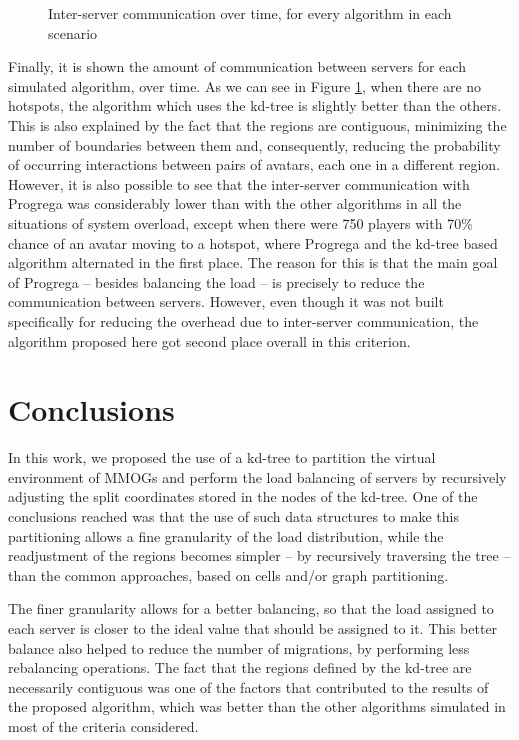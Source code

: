 \documentclass[acmjacm]{acmtrans2m}
\newcommand{\figurecaption}{Figure}
\begin{document}
\begin{figure}[!t]
	\caption{Inter-server communication over time, for every algorithm in each scenario}
	\label{fig:overhead}
\end{figure}

Finally, it is shown the amount of communication between servers for each simulated algorithm, over time. As we can see in \figurecaption{} \ref{fig:overhead}, when there are no hotspots, the algorithm which uses the kd-tree is slightly better than the others. This is also explained by the fact that the regions are contiguous, minimizing the number of boundaries between them and, consequently, reducing the probability of occurring interactions between pairs of avatars, each one in a different region. However, it is also possible to see that the inter-server communication with Progrega was considerably lower than with the other algorithms in all the situations of system overload, except when there were 750 players with 70\% chance of an avatar moving to a hotspot, where Progrega and the kd-tree based algorithm alternated in the first place. The reason for this is that the main goal of Progrega -- besides balancing the load -- is precisely to reduce the communication between servers. However, even though it was not built specifically for reducing the overhead due to inter-server communication, the algorithm proposed here got second place overall in this criterion.

\section{Conclusions}
\label{sec:conc}

In this work, we proposed the use of a kd-tree to partition the virtual environment of MMOGs and perform the load balancing of servers by recursively adjusting the split coordinates stored in the nodes of the kd-tree. One of the conclusions reached was that the use of such data structures to make this partitioning allows a fine granularity of the load distribution, while the readjustment of the regions becomes simpler -- by recursively traversing the tree -- than the common approaches, based on cells and/or graph partitioning.

The finer granularity allows for a better balancing, so that the load assigned to each server is closer to the ideal value that should be assigned to it. This better balance also helped to reduce the number of migrations, by performing less rebalancing operations. The fact that the regions defined by the kd-tree are necessarily contiguous was one of the factors that contributed to the results of the proposed algorithm, which was better than the other algorithms simulated in most of the criteria considered.
\end{document}
